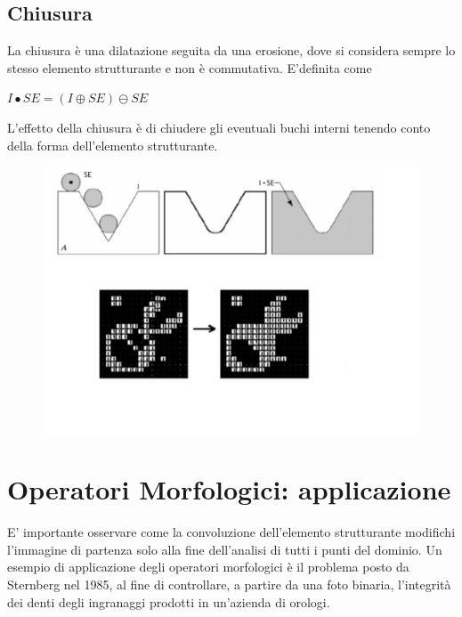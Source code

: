 \subsection{Chiusura}

La chiusura è una dilatazione seguita da una erosione, dove si considera sempre lo stesso elemento strutturante e non è
commutativa.
E'definita come

\begin{center}
    $I \bullet SE = (I \oplus SE) \ominus SE$
\end{center}

L'effetto della chiusura è di chiudere gli eventuali buchi interni tenendo conto della forma dell'elemento strutturante.

\begin{figure}[H]
    \centering
    \includegraphics[width=\linewidth, keepaspectratio]{capitoli/immagini/imgs/chiusura.png}
\end{figure}

\newpage
\section{Operatori Morfologici: applicazione}

E' importante osservare come la convoluzione dell'elemento strutturante modifichi l'immagine di partenza solo alla fine
dell'analisi di tutti i punti del dominio. Un esempio di applicazione degli operatori morfologici è il problema posto da Sternberg nel 1985, al fine di controllare, a
partire da una foto binaria, l'integrità dei denti degli ingranaggi prodotti in un'azienda di orologi.

